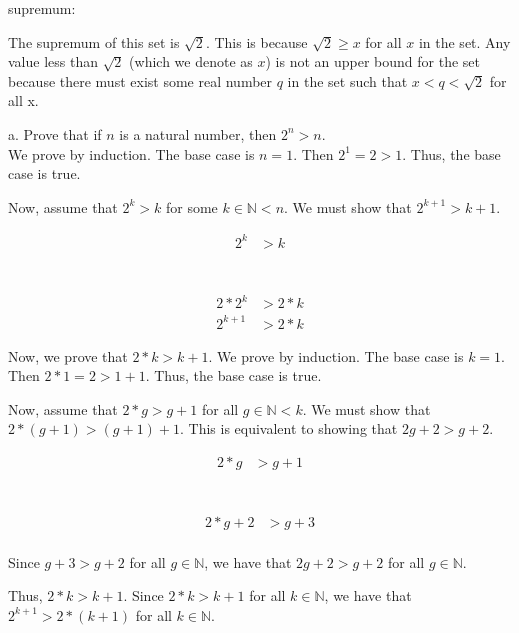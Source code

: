 \documentclass[addpoints]{exam}
\begin{document}
\begin{questions}
supremum:

The supremum of this set is $\sqrt{2}$. This is because $\sqrt{2} \geq x$ for all
$x$ in the set. Any value less than $\sqrt{2}$ (which we denote as $x$) is 
not an upper bound for the set because there must exist some real number $q$ 
in the set such that $x < q < \sqrt{2}$ for all x. 

\question 

a. Prove that if $n$ is a natural number, then $2^n >n$. \\

We prove by induction. The base case is $n = 1$. Then $2^1 = 2 > 1$. Thus, the base case is true.

Now, assume that $2^k > k$ for some $k \in \mathbb{N} < n$. We must show that $2^{k+1} > k+1$.

\begin{align*}
2^{k} &> k \\
\end{align*}

 \\

\begin{align*}
    2 * 2^{k} &>  2* k \\
    2^{k+1} &> 2 * k
\end{align*}

Now, we prove that $2 * k > k + 1$. We prove by induction. The base case is $k = 1$. Then $2 * 1 = 2 > 1 + 1$. Thus, the base case is true.

Now, assume that $2 * g > g + 1$ for all $g \in \mathbb{N} < k$. We must show that 
$2 * (g+1) > (g+1) + 1$. This is equivalent to showing that $2g + 2 > g + 2$.

\begin{align*}
2 * g &> g + 1 \\
\end{align*}

 \\

\begin{align*}
    2 * g + 2 &> g + 3 \\
\end{align*}

Since $g + 3 > g + 2$ for all $g \in \mathbb{N}$, we have that $2g + 2 > g + 2$ for all $g \in \mathbb{N}$.

Thus, $2*k > k + 1$. Since $2 * k > k + 1$ for all $k \in \mathbb{N}$, we have that $2^{k+1} > 2 * (k + 1)$ for all $k \in \mathbb{N}$.


\end{questions}
\end{document}
